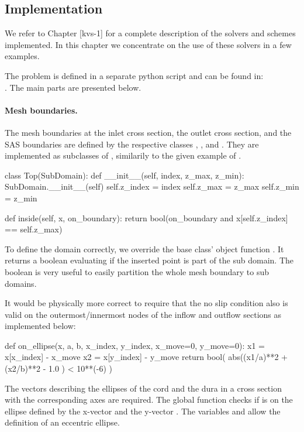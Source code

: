 \subsection{Implementation}
We refer to Chapter [kvs-1] for a complete description of the solvers
and schemes implemented. In this chapter we concentrate on the use of
these solvers in a few examples.

The problem is defined in a separate python script and can be found in: \\
 . The main parts are presented below.

\paragraph{Mesh boundaries.}  The mesh boundaries at the inlet cross section, the outlet cross section, and the SAS boundaries are defined by the respective classes , , and . They are implemented as subclasses of , similarily to the given example of .
\begin{python}
class Top(SubDomain):
	def __init__(self, index, z_max, z_min):
		SubDomain.__init__(self)
		self.z_index = index
		self.z_max = z_max
		self.z_min = z_min

	def inside(self, x, on_boundary):
		return bool(on_boundary and x[self.z_index] == self.z_max)
\end{python}
To define the domain correctly, we override the base class' object function . It returns a boolean evaluating if the inserted point  is part of the sub domain. The boolean  is very useful to easily partition the whole mesh boundary to sub domains.

It would be physically more correct to require that the no slip condition also is valid on the outermost/innermost nodes of the inflow and outflow sections as implemented below:
\begin{python}
def on_ellipse(x, a, b, x_index, y_index, x_move=0, y_move=0):
	x1 = x[x_index] - x_move
	x2 = x[y_index] - y_move
	return bool( abs((x1/a)**2 + (x2/b)**2 - 1.0 ) < 10**(-6) )
\end{python}
The vectors describing the ellipses of the cord and the dura in a cross section with the corresponding axes are required. The global function  checks if  is on the ellipse defined by the x-vector  and the y-vector . The variables  and  allow the definition of an eccentric ellipse.

